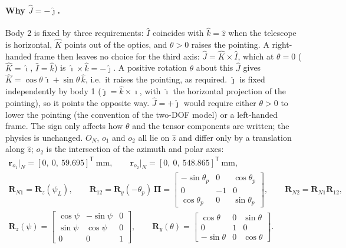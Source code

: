 \documentclass[10pt,a4paper]{article}
\numberwithin{equation}{section}
\begin{document}
\paragraph{Why $\hat J = -\hat\jmath$.} Body 2 is fixed by three requirements: $\hat I$ coincides with $\hat k = \hat z$ when the telescope is horizontal, $\hat K$ points out of the optics, and $\theta > 0$ raises the pointing. A right-handed frame then leaves no choice for the third axis: $\hat J = \hat K\times\hat I$, which at $\theta = 0$ ($\hat K = \hat\imath$, $\hat I = \hat k$) is $\hat\imath\times\hat k = -\hat\jmath$. A positive rotation $\theta$ about this $\hat J$ gives $\hat K = \cos\theta\,\hat\imath + \sin\theta\,\hat k$, i.e.\ it raises the pointing, as required. $\hat\jmath$ is fixed independently by body 1 ($\hat\jmath = \hat k\times\hat\imath$, with $\hat\imath$ the horizontal projection of the pointing), so it points the opposite way. $\hat J = +\hat\jmath$ would require either $\theta > 0$ to lower the pointing (the convention of the two-DOF model) or a left-handed frame. The sign only affects how $\theta$ and the tensor components are written; the physics is unchanged.
$O_N$, $o_1$ and $o_2$ all lie on $\hat z$ and differ only by a translation along $\hat z$; $o_2$ is the intersection of the azimuth and polar axes:
\begin{gather}
\mathbf r_{o_1}\big|_N = [0,\ 0,\ 59.695]^{\mathsf T}\ \text{mm}, \qquad
\mathbf r_{o_2}\big|_N = [0,\ 0,\ 548.865]^{\mathsf T}\ \text{mm}, \\
\mathbf R_{N1} = \mathbf R_z(\psi_L),\qquad \mathbf R_{12} = \mathbf R_y(-\theta_p)\,\boldsymbol\Pi = \begin{bmatrix}-\sin\theta_p & 0 & \cos\theta_p\\ 0&-1&0\\ \cos\theta_p & 0 & \sin\theta_p\end{bmatrix},\qquad \mathbf R_{N2} = \mathbf R_{N1}\mathbf R_{12}, \\
\mathbf R_z(\psi) = \begin{bmatrix}\cos\psi & -\sin\psi & 0\\ \sin\psi & \cos\psi & 0\\ 0&0&1\end{bmatrix}, \qquad
\mathbf R_y(\theta) = \begin{bmatrix}\cos\theta & 0 & \sin\theta\\ 0&1&0\\ -\sin\theta & 0 & \cos\theta\end{bmatrix}.
\end{gather}
\end{document}

